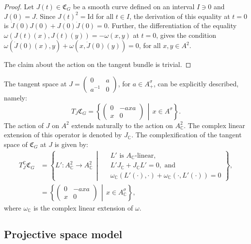 \documentclass[oneside,11pt]{amsart}
\theoremstyle{definition}
\theoremstyle{remark}
\newcommand{\midwd}{\,\middle\vert\,}
\numberwithin{thm}{section}
\numberwithin{equation}{section}
\begin{document}
\begin{proof}
    Let $J(t)\in\mathfrak{C}_G$ be a smooth curve defined on an interval $I\ni 0$ and $J(0)=J$. Since $J(t)^2=\mathrm{Id}$ for all $t\in I$, the derivation of this equality at $t=0$ is $\dot J(0) J(0)+ J(0)\dot J(0)=0$. Further, the differentiation of the equality $\omega(J(t)(x),J(t)(y))=-\omega(x,y)$ at $t=0$, gives the condition $\omega(\dot J(0)(x),y)+\omega(x,\dot J(0)(y))=0$, for all $x,y\in A^2$.

    \noindent The claim about the action on the tangent bundle is trivial. 
\end{proof}

The tangent space at $J=\begin{pmatrix}
        0 & a \\
        a^{-1} & 0
    \end{pmatrix}$, for $a\in A^\sigma_+$, can be  explicitly described, namely:
$$T_J\mathfrak C_G=\left\{\begin{pmatrix}
    0 & -axa \\
    x & 0
\end{pmatrix}\midwd x\in A^\sigma\right\}.$$
The action of $J$ on $A^2$ extends naturally to the action on $A_\mathbb C^2$. The complex linear extension of this operator is denoted by $J_{\mathbb C}$. The complexification of the tangent space of $\mathfrak C_G$ at $J$ is given by:
\begin{align*}
    T_J^\mathbb C\mathfrak{C}_G  & =\left\{L'\colon A_\mathbb C^2\to A_\mathbb C^2\midwd
    \begin{aligned}
        &\ L' \text{ is } A_\mathbb C\text{-linear},\\
        &\ L'J_\mathbb C+J_\mathbb CL'=0,\text{ and }\\
        &\ \omega_\mathbb C(L'(\cdot),\cdot)+\omega_\mathbb C(\cdot,L'(\cdot))=0
    \end{aligned}
    \right\},  \\
    & = \left\{\begin{pmatrix}
    0 & -axa \\
    x & 0
\end{pmatrix}\midwd x\in A_\mathbb C^\sigma\right\},  
\end{align*}
where $\omega_\mathbb C$ is the complex linear extension of $\omega$.

\subsection{Projective space model}\label{sec:projective_A}
\end{document}
